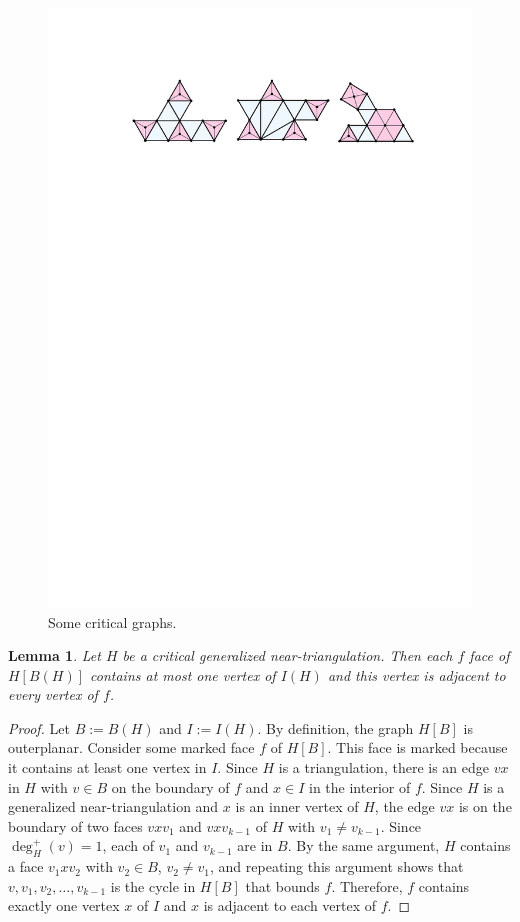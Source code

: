 \documentclass{article}
\newtheorem{lem}{Lemma}
\theoremstyle{definition}
\begin{document}
\begin{figure}[htbp]
    \centering
    \includegraphics[page=1]{figs/critical}
    \caption{Some critical graphs.}
    \label{critical_fig}
\end{figure}


\begin{lem}\label{critical_structure}
    Let $H$ be a critical generalized near-triangulation. Then each $f$ face of $H[B(H)]$ contains at most one vertex of $I(H)$ and this vertex is adjacent to every vertex of $f$.
\end{lem}

\begin{proof}
  Let $B:=B(H)$ and $I:=I(H)$.
  By definition, the graph $H[B]$ is outerplanar.  Consider some marked face $f$ of $H[B]$.  This face is marked because it contains at least one vertex in $I$.  Since $H$ is a triangulation, there is an edge $vx$ in $H$ with $v\in B$ on the boundary of $f$ and $x\in I$ in the interior of $f$. Since $H$ is a generalized near-triangulation and $x$ is an inner vertex of $H$, the edge $vx$ is on the boundary of two faces $vxv_1$ and $vxv_{k-1}$ of $H$ with $v_1\neq v_{k-1}$.  Since $\deg^+_H(v)=1$, each of $v_1$ and $v_{k-1}$ are in $B$.  By the same argument, $H$ contains a face $v_1xv_2$ with $v_2\in B$, $v_2\neq v_1$, and repeating this argument shows that $v,v_1,v_2,\ldots,v_{k-1}$ is the cycle in $H[B]$ that bounds $f$.  Therefore, $f$ contains exactly one vertex $x$ of $I$ and $x$ is adjacent to each vertex of $f$.
\end{proof}
\end{document}
